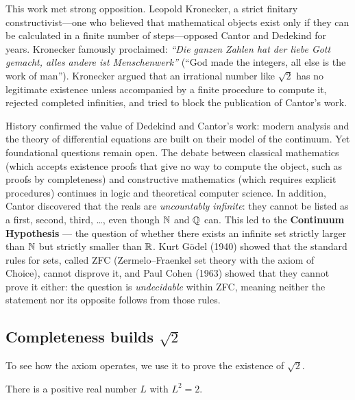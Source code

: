 \begin{historybox}
This work met strong opposition. Leopold Kronecker, a strict finitary
constructivist---one who believed that mathematical objects exist only if they can be calculated
in a finite number of steps---opposed Cantor and Dedekind for years.
Kronecker famously proclaimed: \emph{``Die ganzen Zahlen hat der liebe Gott gemacht, alles andere
ist Menschenwerk''} (``God made the integers, all else is the work of man''). Kronecker argued
that an irrational number like $\sqrt{2}$ has no legitimate existence unless accompanied by a
finite procedure to compute it, rejected completed infinities, and tried to block the
publication of Cantor's work.

History confirmed the value of Dedekind and Cantor's work: modern analysis and the theory of
differential equations are built on their model of the continuum. Yet foundational questions
remain open. The debate
between classical mathematics (which accepts existence proofs that give no way to compute the
object, such as proofs by completeness) and
constructive mathematics (which requires explicit procedures) continues in logic and theoretical
computer science. In addition, Cantor discovered that the reals are \emph{uncountably infinite}:
they cannot be listed as a first, second, third, \ldots, even though $\mathbb{N}$ and $\mathbb{Q}$ can. This led to
the \textbf{Continuum Hypothesis} --- the question of whether there exists an infinite set strictly
larger than $\mathbb{N}$ but strictly smaller than $\mathbb{R}$. Kurt G\"odel (1940) showed that the standard
rules for sets, called ZFC (Zermelo--Fraenkel set theory with the axiom of Choice), cannot
disprove it, and Paul Cohen (1963) showed that they cannot prove
it either: the question is \emph{undecidable} within ZFC, meaning neither the statement nor its
opposite follows from those rules.
\end{historybox}

\subsection*{Completeness builds $\sqrt 2$}

To see how the axiom operates, we use it to prove the existence of $\sqrt 2$.

\begin{theorem}
\label{ch41:sqrt-exists}
There is a positive real number $L$ with $L^2 = 2$.
\end{theorem}

